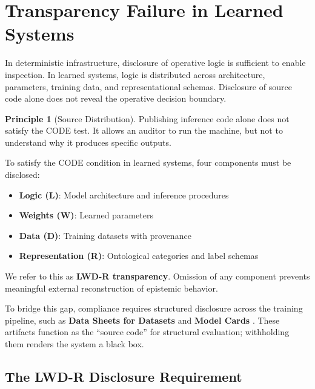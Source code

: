 \documentclass[11pt,a4paper]{article}
\theoremstyle{definition}
\newtheorem{principle}{Principle}[section]
\begin{document}

\section{Transparency Failure in Learned Systems}
\label{sec:code-ai}

In deterministic infrastructure, disclosure of operative logic is sufficient to enable inspection. In learned systems, logic is distributed across architecture, parameters, training data, and representational schemas. Disclosure of source code alone does not reveal the operative decision boundary.

\begin{principle}[Source Distribution]
Publishing inference code alone does not satisfy the CODE test. It allows an auditor to run the machine, but not to understand why it produces specific outputs.
\end{principle}

To satisfy the CODE condition in learned systems, four components must be disclosed:

\begin{itemize}[noitemsep]
    \item \textbf{Logic (L)}: Model architecture and inference procedures
    \item \textbf{Weights (W)}: Learned parameters
    \item \textbf{Data (D)}: Training datasets with provenance
    \item \textbf{Representation (R)}: Ontological categories and label schemas
\end{itemize}

We refer to this as \textbf{LWD-R transparency}. Omission of any component prevents meaningful external reconstruction of epistemic behavior.

To bridge this gap, compliance requires structured disclosure across the training pipeline, such as \textbf{Data Sheets for Datasets} \citep{gebru2021} and \textbf{Model Cards} \citep{mitchell2019}. These artifacts function as the ``source code'' for structural evaluation; withholding them renders the system a black box.

\subsection{The LWD-R Disclosure Requirement}
\end{document}

